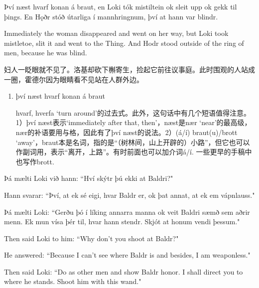 \begin{paracol}{2}
  Því næst hvarf konan á braut, en Loki tók mistiltein ok sleit upp ok gekk til þings. En Hǫðr stóð útarliga í mann\-hringnum, því at hann var blindr.

  \switchcolumn

  Immediately the woman disappeared and went on her way, but Loki took mistletoe, slit it and went to the Thing. And Hodr stood outside of the ring of men, because he was blind.
\end{paracol}
\begin{translation*}{}
  妇人一眨眼就不见了。洛基却砍下槲寄生，捡起它前往议事庭。此时围观的人站成一圈，霍德尔因为眼睛看不见站在人群外边。
\end{translation*}
\begin{grammar*}{}
  \begin{enumerate}[leftmargin=*]
    \item því næst hvarf konan á braut

          hvarf, hverfa `turn around'的过去式。此外，这句话中有几个短语值得注意。1）því næst表示`immediately after that, then'，næst是nær `near'的最高级，nær的补语要用与格，因此有了því næst的说法。2）(á/í) braut(u)/brott `away'，braut本是名词，指的是“（树林间，山上开辟的）小路”，但它也可以作副词用，表示“离开，上路”。有时前面也可以加介词á/í. 一些更早的手稿中也写作brott.
  \end{enumerate}
\end{grammar*}
\begin{paracol}{2}
  Þá mælti Loki við hann: ``Hví skýtr þú ekki at Baldri?"

  Hann svarar: ``Því, at ek sé eigi, hvar Baldr er, ok þat annat, at ek em vápnlauss."

  Þá mælti Loki: ``Gerðu þó í líking annarra manna ok veit Baldri sæmð sem aðrir menn. Ek mun vísa þér til, hvar hann stendr. Skjót at honum vendi þessum."\\

  \switchcolumn

  Then said Loki to him: ``Why don't you shoot at Baldr?"

  He answered: ``Because I can't see where Baldr is and besides, I am weaponless."

  Then said Loki: ``Do as other men and show Baldr honor. I shall direct you to where he stands. Shoot him with this wand."
\end{paracol}

